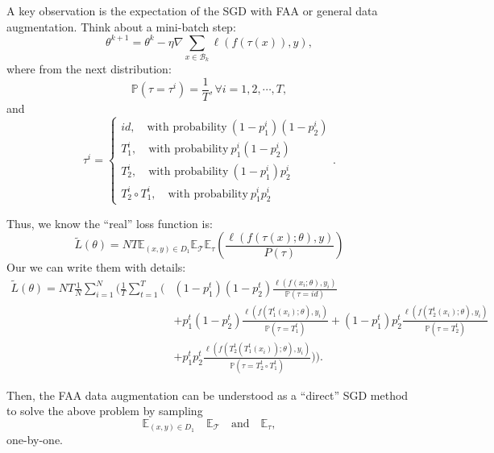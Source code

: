 A key observation is the expectation of the SGD with FAA or general data augmentation. Think about a mini-batch step:
\begin{equation}\label{key}
\theta^{k+1} = \theta^k - \eta \nabla \sum_{x\in \mathcal B_k} \ell(f(\tau(x)), y),
\end{equation}
where  from the next distribution:
\begin{equation}\label{key}
\mathbb P(\tau = \tau^i) = \frac{1}{T}, \forall i = 1, 2, \cdots, T,
\end{equation}
and
\begin{equation}\label{key}
\tau^i = \begin{cases}
id, \quad \text{with probability}~(1-p^i_1)(1-p^i_2) \\
T^i_1, \quad \text{with probability}~p^i_1(1-p^i_2) \\
T^i_2, \quad \text{with probability}~(1-p^i_1)p^i_2 \\
T^i_2\circ T^i_1, \quad \text{with probability}~ p^i_1p^i_2
\end{cases}.
\end{equation}

Thus, we know the ``real'' loss function is:
\begin{equation}\label{key}
\tilde L(\theta)  = N T \mathbb{E}_{(x,y) \in D_1} \mathbb{E}_{\mathcal T} \mathbb{E}_{\tau} \left( \frac{\ell \left( f(\tau(x);\theta), y\right)}{P(\tau)}  \right)
\end{equation}
Our we can write them with details:
\begin{equation}\label{key}
\begin{aligned}
\tilde L(\theta) = N T \frac{1}{N} \sum_{i=1}^N \big( \frac{1}{T}\sum_{t=1}^T \big( &(1-p^t_1)(1-p^t_2)\frac{\ell(f(x_i;\theta),y_i)}{\mathbb P(\tau= id)}  \\
&+ p^t_1(1-p^t_2)  \frac{\ell(f(T^t_1(x_i);\theta),y_i)}{\mathbb P(\tau = T^t_1)} + (1-p^t_1)p^t_2 \frac{\ell(f(T^t_2(x_i);\theta),y_i)}{\mathbb P(\tau = T^t_2)}  \\
&+  p^t_1p^t_2\frac{\ell(f(T^t_2 (T^t_1(x_i) );\theta),y_i)}{\mathbb P(\tau = T^t_2 \circ T^t_1)}   \big) \big).
\end{aligned}
\end{equation}




Then, the FAA data augmentation can be understood as a ``direct'' SGD method to solve the above problem by sampling 
\begin{equation}\label{key}
\mathbb{E}_{(x,y) \in D_1} \quad  \mathbb{E}_{ \mathcal T} \quad \text{and} \quad \mathbb{E}_{\tau},
\end{equation}
one-by-one.

